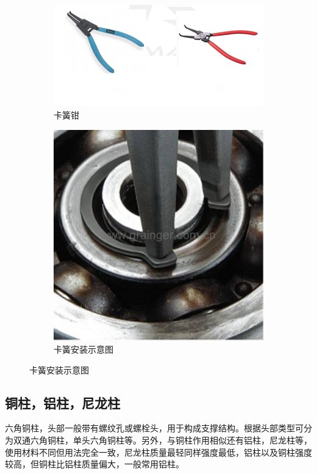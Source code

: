 \documentclass[UTF8]{article} %
\begin{document}
\begin{figure}[H]
  \centering
  \begin{subfigure}[b]{0.4\textwidth}
         \centering
         \includegraphics[width=\textwidth]{ka1.png}
          \caption{卡簧钳}
  \end{subfigure}
  \quad
  \begin{subfigure}[b]{0.2\textwidth}
          \centering
          \includegraphics[width=\textwidth]{ka2.png}
          \caption{卡簧安装示意图}
  \end{subfigure}
\end{figure}



\subsection{铜柱，铝柱，尼龙柱}
六角铜柱，头部一般带有螺纹孔或螺栓头，用于构成支撑结构。根据头部类型可分为双通六角铜柱，单头六角铜柱等。另外，与铜柱作用相似还有铝柱，尼龙柱等，使用材料不同但用法完全一致，尼龙柱质量最轻同样强度最低，铝柱以及铜柱强度较高，但铜柱比铝柱质量偏大，一般常用铝柱。
\end{document}
